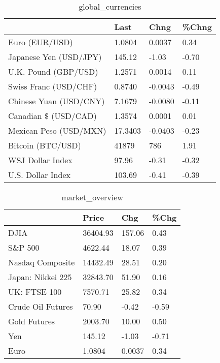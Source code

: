 \documentclass{article}%
\begin{document}
\begin{table}[htbp]%
\caption{global\_currencies}%
\centering%
\begin{adjustbox}{width=1\textwidth}%
\begin{tabular}{llll}
\toprule
                       &    Last &    Chng & \%Chng \\
\midrule
        Euro (EUR/USD) &  1.0804 &  0.0037 &  0.34 \\
Japanese Yen (USD/JPY) &  145.12 &   -1.03 & -0.70 \\
  U.K. Pound (GBP/USD) &  1.2571 &  0.0014 &  0.11 \\
 Swiss Franc (USD/CHF) &  0.8740 & -0.0043 & -0.49 \\
Chinese Yuan (USD/CNY) &  7.1679 & -0.0080 & -0.11 \\
  Canadian \$ (USD/CAD) &  1.3574 &  0.0001 &  0.01 \\
Mexican Peso (USD/MXN) & 17.3403 & -0.0403 & -0.23 \\
     Bitcoin (BTC/USD) &   41879 &     786 &  1.91 \\
      WSJ Dollar Index &   97.96 &   -0.31 & -0.32 \\
     U.S. Dollar Index &  103.69 &   -0.41 & -0.39 \\
\bottomrule
\end{tabular}
%
\end{adjustbox}%
\end{table}

%


\begin{table}[htbp]%
\caption{market\_overview}%
\centering%
\begin{adjustbox}{width=1\textwidth}%
\begin{tabular}{llll}
\toprule
                  &    Price &    Chg &  \%Chg \\
\midrule
             DJIA & 36404.93 & 157.06 &  0.43 \\
          S\&P 500 &  4622.44 &  18.07 &  0.39 \\
 Nasdaq Composite & 14432.49 &  28.51 &  0.20 \\
Japan: Nikkei 225 & 32843.70 &  51.90 &  0.16 \\
     UK: FTSE 100 &  7570.71 &  25.82 &  0.34 \\
Crude Oil Futures &    70.90 &  -0.42 & -0.59 \\
     Gold Futures &  2003.70 &  10.00 &  0.50 \\
              Yen &   145.12 &  -1.03 & -0.71 \\
             Euro &   1.0804 & 0.0037 &  0.34 \\
\bottomrule
\end{tabular}
%
\end{adjustbox}%
\end{table}

%
\end{document}
